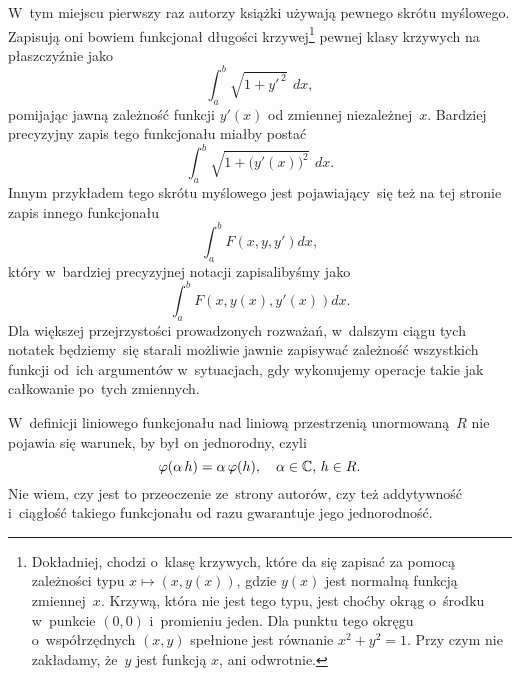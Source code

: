 \documentclass[a4paper,11pt]{article}
\begin{document}
 W~tym miejscu pierwszy raz autorzy książki używają pewnego
skrótu myślowego. Zapisują oni bowiem funkcjonał długości
krzywej\footnote{Dokładniej, chodzi o~klasę krzywych, które da się zapisać za
  pomocą zależności typu $x \mapsto ( x, y( x ) )$, gdzie $y( x )$ jest normalną
  funkcją zmiennej~$x$. Krzywą, która nie jest tego typu, jest choćby okrąg
  o~środku w~punkcie $( 0, 0 )$ i~promieniu jeden. Dla punktu tego okręgu
  o~współrzędnych $( x, y )$ spełnione jest równanie
  $x^{ 2 } + y^{ 2 } = 1$. Przy czym nie zakładamy, że~$y$ jest funkcją $x$,
  ani odwrotnie.} pewnej klasy krzywych na płaszczyźnie jako
\begin{equation}
  \label{eq:Gelfand-Fomin-Year1972-01}
  \int_{ a }^{ b } \sqrt{ 1 + y'^{ \, 2 } } \,\: dx,
\end{equation}
pomijając jawną zależność funkcji $y'( x )$ od zmiennej niezależnej~$x$.
Bardziej precyzyjny zapis tego funkcjonału miałby postać
\begin{equation}
  \label{eq:Gelfand-Fomin-Year1972-02}
  \int_{ a }^{ b } \sqrt{ 1 + \big( y'( x ) \big)^{ 2 } } \,\: dx.
\end{equation}
Innym przykładem tego skrótu myślowego jest pojawiający~się też na tej
stronie zapis innego funkcjonału
\begin{equation}
  \label{eq:Gelfand-Fomin-Year1972-03}
  \int_{ a }^{ b } F\left( x, y, y' \right) dx,
\end{equation}
który w~bardziej precyzyjnej notacji zapisalibyśmy jako
\begin{equation}
  \label{eq:Gelfand-Fomin-Year1972-04}
  \int_{ a }^{ b } F\left( x, y( x ), y'( x ) \right) dx.
\end{equation}
Dla większej przejrzystości prowadzonych rozważań, w~dalszym ciągu tych
notatek będziemy~się starali możliwie jawnie zapisywać zależność wszystkich
funkcji od~ich argumentów w~sytuacjach, gdy wykonujemy operacje takie
jak całkowanie po~tych zmiennych.

\vspace{\spaceFour}





 W~definicji liniowego funkcjonału nad liniową przestrzenią
unormowaną~$R$ nie pojawia się warunek, by był on jednorodny, czyli
\begin{equation}
  \label{eq:Gelfand-Fomin-Year1972-05}
  \varphi( \alpha \, h ) = \alpha \, \varphi( h ), \quad \alpha \in \mathbb{C}, \, h \in R.
\end{equation}
Nie wiem, czy jest to przeoczenie ze~strony autorów, czy też addytywność
i~ciągłość takiego funkcjonału od razu gwarantuje jego jednorodność.
\end{document}
